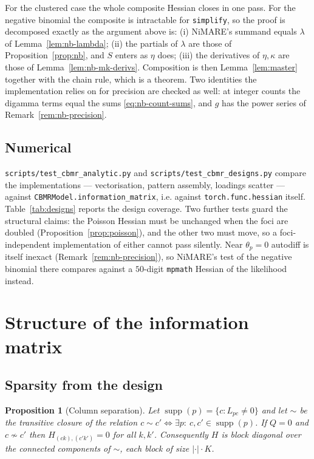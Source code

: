\documentclass[11pt,a4paper]{article}
\theoremstyle{plain}
\newtheorem{proposition}{Proposition}
\theoremstyle{definition}
\newcommand{\supp}{\operatorname{supp}}
\begin{document}
For the clustered case the whole composite Hessian closes in one pass. For the negative binomial
the composite is intractable for \texttt{simplify}, so the proof is decomposed exactly as the
argument above is: (i) NiMARE's summand equals $\lambda$ of Lemma~\ref{lem:nb-lambda}; (ii) the
partials of $\lambda$ are those of Proposition~\ref{prop:nb}, and $S$ enters as $\eta$ does;
(iii) the derivatives of $\eta,\kappa$ are those of Lemma~\ref{lem:nb-mk-derivs}. Composition is
then Lemma~\ref{lem:master} together with the chain rule, which is a theorem. Two identities the
implementation relies on for precision are checked as well: at integer counts the digamma terms
equal the sums \eqref{eq:nb-count-sums}, and $g$ has the power series of
Remark~\ref{rem:nb-precision}.

\subsection{Numerical}

\texttt{scripts/test\_cbmr\_analytic.py} and \texttt{scripts/test\_cbmr\_designs.py} compare
the implementations --- vectorisation, pattern assembly, loadings scatter --- against
\texttt{CBMRModel.information\_matrix}, i.e. against \texttt{torch.func.hessian} itself.
Table~\ref{tab:designs} reports the design coverage. Two further tests guard the structural
claims: the Poisson Hessian must be unchanged when the foci are doubled
(Proposition~\ref{prop:poisson}), and the other two must move, so a foci-independent
implementation of either cannot pass silently. Near $\theta_p = 0$ autodiff is itself inexact
(Remark~\ref{rem:nb-precision}), so NiMARE's test of the negative binomial there compares against
a $50$-digit \texttt{mpmath} Hessian of the likelihood instead.

\section{Structure of the information matrix}

\subsection{Sparsity from the design}

\begin{proposition}[Column separation]\label{prop:blocks}
Let $\supp(p) = \{c : L_{pc} \neq 0\}$ and let $\sim$ be the transitive closure of the relation
$c \sim c' \iff \exists p:\ c,c' \in \supp(p)$. If $Q = 0$ and $c \not\sim c'$ then
$H_{(ck),(c'k')} = 0$ for all $k,k'$. Consequently $H$ is block diagonal over the connected
components of $\sim$, each block of size $|{\cdot}| \cdot K$.
\end{proposition}
\end{document}
